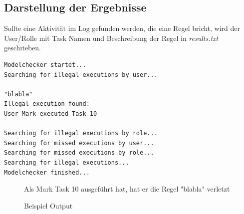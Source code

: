 %
%
\subsection{Darstellung der Ergebnisse}
\label{sec:results}
Sollte eine Aktivität im Log gefunden werden, die eine Regel bricht, wird der User/Rolle mit Task Namen und Beschreibung der Regel in \textit{results.txt} geschrieben.

\begin{verbatim}
Modelchecker startet...
Searching for illegal executions by user...

"blabla"
Illegal execution found: 
User Mark executed Task 10

Searching for illegal executions by role...
Searching for missed executions by user...
Searching for missed executions by role...
Searching for illegal executions...
Modelchecker finished...
\end{verbatim}
\begin{figure}[!h]
\small Als Mark Task 10 ausgeführt hat, hat er die Regel "blabla" verletzt
\caption{Beispiel Output}
\label{fig:sampleoutput}
\end{figure}
